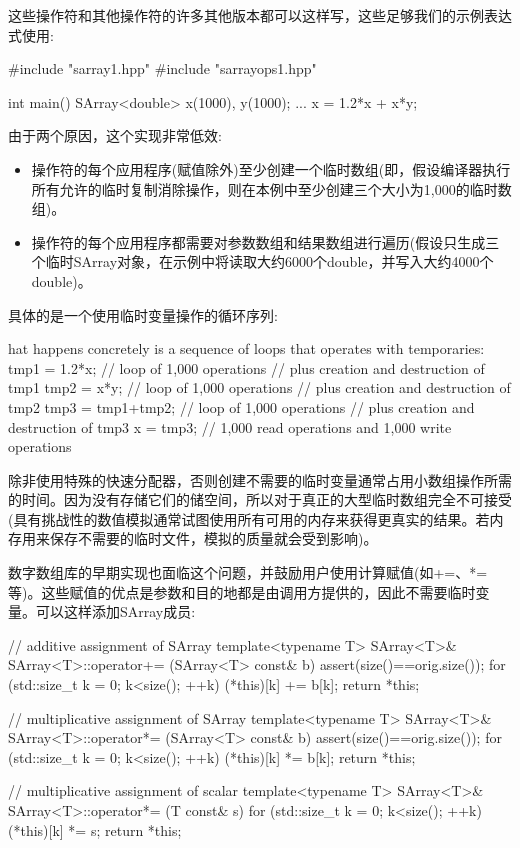 这些操作符和其他操作符的许多其他版本都可以这样写，这些足够我们的示例表达式使用:

\begin{cpp}
#include "sarray1.hpp"
#include "sarrayops1.hpp"

int main()
{
	SArray<double> x(1000), y(1000);
	...
	x = 1.2*x + x*y;
}
\end{cpp}

由于两个原因，这个实现非常低效:

\begin{itemize}
\item 
操作符的每个应用程序(赋值除外)至少创建一个临时数组(即，假设编译器执行所有允许的临时复制消除操作，则在本例中至少创建三个大小为1,000的临时数组)。

\item 
操作符的每个应用程序都需要对参数数组和结果数组进行遍历(假设只生成三个临时SArray对象，在示例中将读取大约6000个double，并写入大约4000个double)。
\end{itemize}

具体的是一个使用临时变量操作的循环序列:

\begin{cpp}
hat happens concretely is a sequence of loops that operates with temporaries:
tmp1 = 1.2*x; // loop of 1,000 operations
			  // plus creation and destruction of tmp1
tmp2 = x*y; // loop of 1,000 operations
		  // plus creation and destruction of tmp2
tmp3 = tmp1+tmp2; // loop of 1,000 operations
				  // plus creation and destruction of tmp3
x = tmp3; // 1,000 read operations and 1,000 write operations
\end{cpp}

除非使用特殊的快速分配器，否则创建不需要的临时变量通常占用小数组操作所需的时间。因为没有存储它们的储空间，所以对于真正的大型临时数组完全不可接受(具有挑战性的数值模拟通常试图使用所有可用的内存来获得更真实的结果。若内存用来保存不需要的临时文件，模拟的质量就会受到影响)。

数字数组库的早期实现也面临这个问题，并鼓励用户使用计算赋值(如+=、*=等)。这些赋值的优点是参数和目的地都是由调用方提供的，因此不需要临时变量。可以这样添加SArray成员:

\begin{cpp}
// additive assignment of SArray
template<typename T>
SArray<T>& SArray<T>::operator+= (SArray<T> const& b)
{
	assert(size()==orig.size());
	for (std::size_t k = 0; k<size(); ++k) {
		(*this)[k] += b[k];
	}
	return *this;
}

// multiplicative assignment of SArray
template<typename T>
SArray<T>& SArray<T>::operator*= (SArray<T> const& b)
{
	assert(size()==orig.size());
	for (std::size_t k = 0; k<size(); ++k) {
		(*this)[k] *= b[k];
	}
	return *this;
}

// multiplicative assignment of scalar
template<typename T>
SArray<T>& SArray<T>::operator*= (T const& s)
{
	for (std::size_t k = 0; k<size(); ++k) {
		(*this)[k] *= s;
	}
	return *this;
}
\end{cpp}

